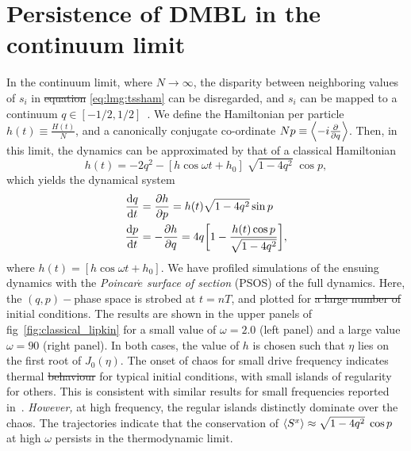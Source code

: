 \documentclass[%
reprint,
superscriptaddress,
amsmath,amssymb,
aps,
prb,
showkeys,
]{revtex4-2}
\providecommand{\DIFaddtex}[1]{{\protect\color{blue}\uwave{#1}}} %
\providecommand{\DIFdeltex}[1]{{\protect\color{red}\sout{#1}}}                      %
\providecommand{\DIFaddbegin}{} %
\providecommand{\DIFaddend}{} %
\providecommand{\DIFdelbegin}{} %
\providecommand{\DIFdelend}{} %
\providecommand{\DIFadd}[1]{\texorpdfstring{\DIFaddtex{#1}}{#1}} %
\providecommand{\DIFdel}[1]{\texorpdfstring{\DIFdeltex{#1}}{}} %
\newcommand{\DIFscaledelfig}{0.5}
\newlength{\DIFdelgraphicswidth} %
\newlength{\DIFdelgraphicsheight} %
\newcommand{\DIFaddincludegraphics}[2][]{{\color{blue}\fbox{\DIFOincludegraphics[#1]{#2}}}} %
\newcommand{\DIFdelincludegraphics}[2][]{%
\sbox{\DIFdelgraphicsbox}{\DIFOincludegraphics[#1]{#2}}%
\settoboxwidth{\DIFdelgraphicswidth}{\DIFdelgraphicsbox} %
\settoboxtotalheight{\DIFdelgraphicsheight}{\DIFdelgraphicsbox} %
\scalebox{\DIFscaledelfig}{%
\parbox[b]{\DIFdelgraphicswidth}{\usebox{\DIFdelgraphicsbox}\\[-\baselineskip] \rule{\DIFdelgraphicswidth}{0em}}\llap{\resizebox{\DIFdelgraphicswidth}{\DIFdelgraphicsheight}{%
\setlength{\unitlength}{\DIFdelgraphicswidth}%
\begin{picture}(1,1)%
\thicklines\linethickness{2pt} %
{\color[rgb]{1,0,0}\put(0,0){\framebox(1,1){}}}%
{\color[rgb]{1,0,0}\put(0,0){\line( 1,1){1}}}%
{\color[rgb]{1,0,0}\put(0,1){\line(1,-1){1}}}%
\end{picture}%
}\hspace*{3pt}}} %
} %
\DeclareRobustCommand{\DIFaddbegin}{\DIFOaddbegin \let\includegraphics\DIFaddincludegraphics} %
\DeclareRobustCommand{\DIFaddend}{\DIFOaddend \let\includegraphics\DIFOincludegraphics} %
\DeclareRobustCommand{\DIFdelbegin}{\DIFOdelbegin \let\includegraphics\DIFdelincludegraphics} %
\DeclareRobustCommand{\DIFdelend}{\DIFOaddend \let\includegraphics\DIFOincludegraphics} %
\begin{document}
\section{\label{sec:level4}Persistence of DMBL in the continuum limit}
In the continuum limit, where $N\rightarrow\infty$, the disparity between neighboring values of $s_i$ in \DIFdelbegin \DIFdel{equation }\DIFdelend \DIFaddbegin \DIFadd{eq.~}\DIFaddend \ref{eq:lmg:tssham} can be disregarded, and $s_i$ can be mapped to a continuum $q\in \left[-1/2, 1/2\right]$~\cite{mori_prethermalization_2019}. We define	the Hamiltonian per particle $h(t)\equiv \frac{H(t)}{N}$, and a canonically conjugate co-ordinate $Np\equiv \expval{-i\pdv{}{q}}$. Then, in this limit, the dynamics can be approximated by that of a classical Hamiltonian~\cite{sciolla_quantum_2010}
\begin{equation}
	h(t) = -2 q^2 - \left[h\cos{\omega t} + h_0\right]\;\sqrt{1-4q^2}\;\cos{p},
	\label{eq:class:ham}
\end{equation}
which yields the dynamical system 
\begin{align}
	\dv{q}{t} &= \pdv{h}{p} = h(t)\sqrt{1-4q^2}\sin{p}\nonumber \\
	\dv{p}{t} &= -\pdv{h}{q} = 4q\bigg[1-\frac{h(t)\cos{p}}{\sqrt{1-4q^2}}\bigg],
	\label{eq:class:poinc}
\end{align}
where $h(t) = \left[h\cos{\omega t} + h_0\right]$. We have profiled simulations of the ensuing dynamics with the \emph{Poincar$\acute{e}$ surface of section} (PSOS) of the full dynamics. Here, the $\left(q,p\right)-$phase space is strobed at $t=nT$, and plotted for \DIFdelbegin \DIFdel{a large number of }\DIFdelend \DIFaddbegin \DIFadd{many }\DIFaddend initial conditions. The results are shown in the upper panels of fig\DIFaddbegin \DIFadd{.}\DIFaddend ~\ref{fig:classical_lipkin} for a small value of $\omega=2.0$ (left panel) and a large value $\omega=90$ (right panel). In both cases, the value of $h$ is chosen such that $\eta$ lies on the first root of $J_0(\eta)$. The onset of chaos for small drive frequency indicates thermal \DIFdelbegin \DIFdel{behaviour }\DIFdelend \DIFaddbegin \DIFadd{behavior }\DIFaddend for typical initial conditions, with small islands of regularity for others. This is consistent with similar results for small frequencies reported in~\cite{russomanno_thermalization_2015, Kidd2019}. \emph{However,} at high frequency, the regular islands distinctly dominate over the chaos. The trajectories indicate that the conservation of $\expval{S^x}\approx \sqrt{1-4q^2}\;\cos{p}$~\cite{mori_prethermalization_2019} at high $\omega$ persists in the thermodynamic limit.
\end{document}
